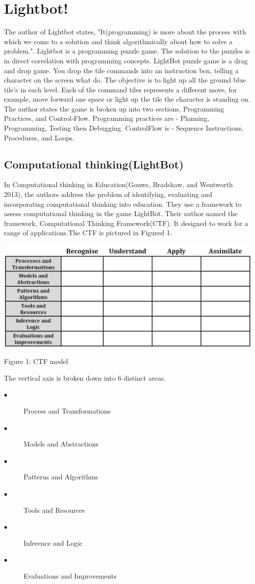 \section{Lightbot!}
The author of Lightbot states, "It(programming) is more about the process with which we come to a solution and think algorithmically about how to solve a problem.". Lightbot is a programming puzzle game. The solution to the puzzles is in direct correlation with programming concepts. LightBot puzzle game is a drag and drop game. You drop the tile commands into an instruction box, telling a character on the screen what do. The objective is to light up all the ground blue tile’s in each level. Each of the command tiles represents a different move, for example, move forward one space or light up the tile the character is standing on. The author states the game is broken up into two sections, Programming Practices, and Control-Flow. Programming practices are - Planning, Programming, Testing then Debugging. ControlFlow is - Sequence Instructions, Procedures, and Loops.

\subsection{Computational thinking(LightBot)}
In Computational thinking in Education(Gouws, Bradshaw, and Wentworth 2013), the authors address the problem of identifying, evaluating and incorporating computational thinking into education. They use a framework to assess computational thinking in the game LightBot. Their author named the framework, Computational Thinking Framework(CTF). It designed to work for a range of applications.The CTF is pictured in Figured 1.


\includegraphics[scale=0.35]{CTFModel.png}

Figure 1: CTF model

The vertical axis is broken down into 6 distinct areas.

\begin{description}
	\item[$\bullet$] Process and Transformations
	\item[$\bullet$] Models and Abstractions
	\item[$\bullet$] Patterns and Algorithms
	\item[$\bullet$] Tools and Resources
	\item[$\bullet$] Inference and Logic
	\item[$\bullet$] Evaluations and Improvements	
\end{description}

